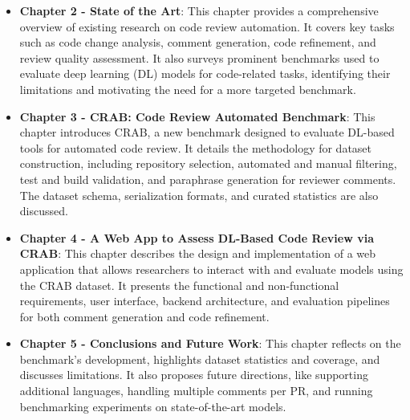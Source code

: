 \begin{itemize}
	\item \textbf{Chapter 2 - State of the Art}: This chapter provides a comprehensive overview of
	      existing research on code review automation. It covers key tasks such as code change
	      analysis, comment generation, code refinement, and review quality assessment. It also
	      surveys prominent benchmarks used to evaluate deep learning (DL) models for code-related
	      tasks, identifying their limitations and motivating the need for a more targeted benchmark.

	\item \textbf{Chapter 3 - CRAB: Code Review Automated Benchmark}: This chapter introduces CRAB,
	      a new benchmark designed to evaluate DL-based tools for automated code review. It details
	      the methodology for dataset construction, including repository selection, automated and
	      manual filtering, test and build validation, and paraphrase generation for reviewer
	      comments. The dataset schema, serialization formats, and curated statistics are also
	      discussed.

	\item \textbf{Chapter 4 - A Web App to Assess DL-Based Code Review via CRAB}: This chapter
	      describes the design and implementation of a web application that allows researchers to
	      interact with and evaluate models using the CRAB dataset. It presents the functional and
	      non-functional requirements, user interface, backend architecture, and evaluation pipelines
	      for both comment generation and code refinement.


	\item \textbf{Chapter 5 - Conclusions and Future Work}: This chapter reflects on the benchmark’s
	      development, highlights dataset statistics and coverage, and discusses limitations. It also
	      proposes future directions, like supporting additional languages, handling multiple comments
	      per PR, and running benchmarking experiments on state-of-the-art models.
\end{itemize}
